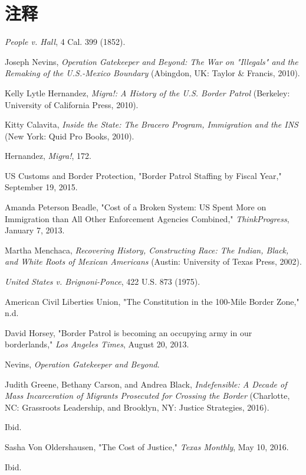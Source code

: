 \documentclass[fontset=fandol, a4paper, 12pt, openright]{ctexbook}
\begin{document}
\section*{注释}
\begin{enumerate}[label={[\arabic*]}]
    \item \textit{People v. Hall}, 4 Cal. 399 (1852).
    \item Joseph Nevins, \textit{Operation Gatekeeper and Beyond: The War on "Illegals" and the Remaking of the U.S.-Mexico Boundary} (Abingdon, UK: Taylor \& Francis, 2010).
    \item Kelly Lytle Hernandez, \textit{Migra!: A History of the U.S. Border Patrol} (Berkeley: University of California Press, 2010).
    \item Kitty Calavita, \textit{Inside the State: The Bracero Program, Immigration and the INS} (New York: Quid Pro Books, 2010).
    \item Hernandez, \textit{Migra!}, 172.
    \item US Customs and Border Protection, "Border Patrol Staffing by Fiscal Year," September 19, 2015.
    \item Amanda Peterson Beadle, "Cost of a Broken System: US Spent More on Immigration than All Other Enforcement Agencies Combined," \textit{ThinkProgress}, January 7, 2013.
    \item Martha Menchaca, \textit{Recovering History, Constructing Race: The Indian, Black, and White Roots of Mexican Americans} (Austin: University of Texas Press, 2002).
    \item \textit{United States v. Brignoni-Ponce}, 422 U.S. 873 (1975).
    \item American Civil Liberties Union, "The Constitution in the 100-Mile Border Zone," n.d.
    \item David Horsey, "Border Patrol is becoming an occupying army in our borderlands," \textit{Los Angeles Times}, August 20, 2013.
    \item Nevins, \textit{Operation Gatekeeper and Beyond}.
    \item Judith Greene, Bethany Carson, and Andrea Black, \textit{Indefensible: A Decade of Mass Incarceration of Migrants Prosecuted for Crossing the Border} (Charlotte, NC: Grassroots Leadership, and Brooklyn, NY: Justice Strategies, 2016).
    \item Ibid.
    \item Sasha Von Oldershausen, "The Cost of Justice," \textit{Texas Monthly}, May 10, 2016.
    \item Ibid.

\end{enumerate}
\end{document}
